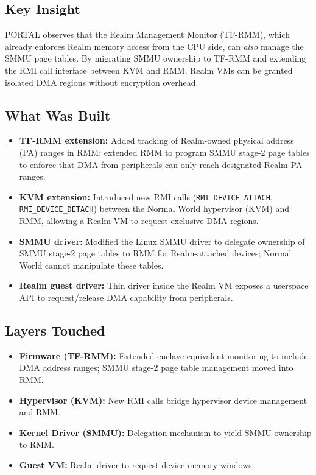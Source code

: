 \documentclass[11pt,letterpaper]{article}
\begin{document}
\subsection*{Key Insight}
PORTAL observes that the Realm Management Monitor (TF-RMM), which already enforces Realm memory access from the CPU side, can \emph{also} manage the SMMU page tables.
By migrating SMMU ownership to TF-RMM and extending the RMI call interface between KVM and RMM, Realm VMs can be granted isolated DMA regions without encryption overhead.

\subsection*{What Was Built}
\begin{itemize}
    \item \textbf{TF-RMM extension:} Added tracking of Realm-owned physical address (PA) ranges in RMM; extended RMM to program SMMU stage-2 page tables to enforce that DMA from peripherals can only reach designated Realm PA ranges.
    \item \textbf{KVM extension:} Introduced new RMI calls (\texttt{RMI\_DEVICE\_ATTACH}, \texttt{RMI\_DEVICE\_DETACH}) between the Normal World hypervisor (KVM) and RMM, allowing a Realm VM to request exclusive DMA regions.
    \item \textbf{SMMU driver:} Modified the Linux SMMU driver to delegate ownership of SMMU stage-2 page tables to RMM for Realm-attached devices; Normal World cannot manipulate these tables.
    \item \textbf{Realm guest driver:} Thin driver inside the Realm VM exposes a userspace API to request/release DMA capability from peripherals.
\end{itemize}

\subsection*{Layers Touched}
\begin{itemize}
    \item \textbf{Firmware (TF-RMM):} Extended enclave-equivalent monitoring to include DMA address ranges; SMMU stage-2 page table management moved into RMM.
    \item \textbf{Hypervisor (KVM):} New RMI calls bridge hypervisor device management and RMM.
    \item \textbf{Kernel Driver (SMMU):} Delegation mechanism to yield SMMU ownership to RMM.
    \item \textbf{Guest VM:} Realm driver to request device memory windows.
\end{itemize}
\end{document}
